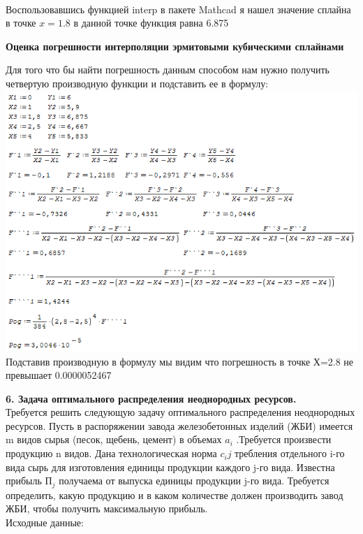 \documentclass[russian,utf8,nocolumnxxxi,nocolumnxxxii]{eskdtext}
\begin{document}
\\Воспользовавшись функцией interp в пакете Mathcad я нашел значение сплайна в точке $x=1.8$ в данной точке функция равна 6.875
\newpage
\begin{center}

{\bf Оценка погрешности интерполяции эрмитовыми
кубическими сплайнами}

\end{center}
Для того что бы найти погрешность данным способом нам нужно получить четвертую производную функции и подставить ее в формулу:
\\\includegraphics[scale=1]{2}
\\Подставив производную в формулу мы видим что погрешность в точке Х=2.8 не превышает 0.0000052467
\newpage 
\par 
\normalsize 
{\bf6. Задача оптимального распределения неоднородных ресурсов.}\\ 
Требуется решить следующую задачу оптимального распределения неоднородных ресурсов. Пусть в распоряжении завода железобетонных изделий (ЖБИ) имеется m видов сырья (песок, щебень, цемент) в объемах $ a_i$ .Требуется произвести продукцию n видов. Дана технологическая норма $c_ij$ требления отдельного i-го вида сырь для изготовления единицы продукции каждого j-го вида. Известна прибыль $П_j$ получаема от выпуска единицы продукции j-го вида. Требуется определить, какую продукцию и в каком количестве должен производить завод ЖБИ, чтобы получить максимальную прибыль.\\ 
Исходные данные:\\ 
\end{document}
